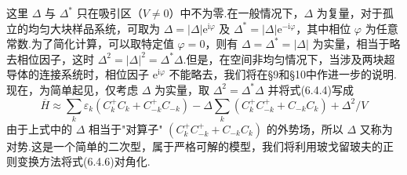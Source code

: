 这里 $\Delta$ 与 $\Delta^{*}$ 只在吸引区（$V\neq0$）中不为零.在一般情况下，$\Delta$ 为复量，对于孤立的均匀大块样品系统，可取为 $\Delta=|\Delta|\mathrm{e}^{\mathrm{i}\varphi}$ 及 $\Delta^{*}=|\Delta|\mathrm{e}^{-\mathrm{i}\varphi}$，其中相位 $\varphi$ 为任意常数.为了简化计算，可以取特定值 $\varphi=0$，则有 $\Delta=\Delta^{*}=|\Delta|$ 为实量，相当于略去相位因子，这时 $\Delta^{2}=|\Delta|^{2}=\Delta^{*}\Delta$.但是，在空间非均匀情况下，当涉及两块超导体的连接系统时，相位因子 $\mathrm{e}^{\mathrm{i}\varphi}$ 不能略去，我们将在§9和§10中作进一步的说明.现在，为简单起见，仅考虑 $\Delta$ 为实量，取 $\Delta^{2}=\Delta^{*}\Delta$ 并将式(6.4.4)写成
\begin{equation}
  \overline{H}\approx\sum_{k}\varepsilon_{k}
  \left(C^{+}_{k}C_{k}+C^{+}_{-k}C_{-k}\right)
  -\Delta\sum_{k}\left(C^{+}_{k}C^{+}_{-k}+C_{-k}C_{k}\right)+\Delta^{2}/V
\end{equation}
由于上式中的 $\Delta$ 相当于"对算子" $\left(C^{+}_{k}C^{+}_{-k}+C_{-k}C_{k}\right)$ 的外势场，所以 $\Delta$ 又称为对势.这是一个简单的二次型，属于严格可解的模型，我们将利用玻戈留玻夫的正则变换方法将式(6.4.6)对角化.

